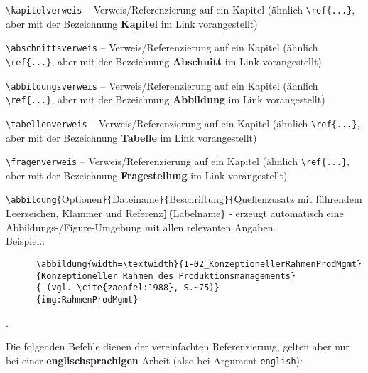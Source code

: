 \begin{description}

  \item{\verb"\kapitelverweis"} -- Verweis/Referenzierung auf ein Kapitel (ähnlich \verb"\ref{...}", aber mit der
      Bezeichnung \textbf{Kapitel} im Link vorangestellt)

  \item{\verb"\abschnittsverweis"} -- Verweis/Referenzierung auf ein Kapitel (ähnlich \verb"\ref{...}", aber mit
      der Bezeichnung \textbf{Abschnitt} im Link vorangestellt)

  \item{\verb"\abbildungsverweis"} -- Verweis/Referenzierung auf ein Kapitel (ähnlich \verb"\ref{...}", aber mit
      der Bezeichnung \textbf{Abbildung} im Link vorangestellt)

  \item{\verb"\tabellenverweis"} -- Verweis/Referenzierung auf ein Kapitel (ähnlich \verb"\ref{...}", aber mit
      der Bezeichnung \textbf{Tabelle} im Link vorangestellt)

  \item{\verb"\fragenverweis"} -- Verweis/Referenzierung auf ein Kapitel (ähnlich \verb"\ref{...}", aber mit
      der Bezeichnung \textbf{Fragestellung} im Link vorangestellt)

  \item{\verb"\abbildung{"Optionen\verb"}{"Dateiname\verb"}{"Beschriftung\verb"}{"Quellenzusatz mit	führendem
      Leerzeichen, Klammer und Referenz\verb"}{"Labelname\verb"}"} - erzeugt automatisch eine
      Abbildungs-/Figure-Umgebung mit allen relevanten Angaben.\\Beispiel.:
      \begin{verbatim}
      \abbildung{width=\textwidth}{1-02_KonzeptionellerRahmenProdMgmt}
      {Konzeptioneller Rahmen des Produktionsmanagements}
      { (vgl. \cite{zaepfel:1988}, S.~75)}
      {img:RahmenProdMgmt}
      \end{verbatim}.

 \end{description}

Die folgenden Befehle dienen der vereinfachten Referenzierung, gelten aber nur bei einer \textbf{englischsprachigen} Arbeit (also bei Argument \verb"english"):

